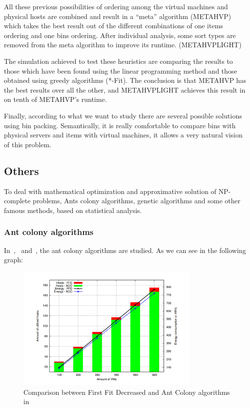 All these previous possibilities of ordering among the virtual machines and physical
hosts are combined and result in a “meta” algorithm (METAHVP) which takes the best result
out of the different combinations of one items ordering and one bins ordering. After
individual analysis, some sort types are removed from the meta algorithm to improve
its runtime. (METAHVPLIGHT)

The simulation achieved to test these heuristics are comparing the results to those
which have been found using the linear programming method and those obtained using
greedy algorithms (*-Fit). The conclusion is that METAHVP has the best results over
all the other, and METAHVPLIGHT achieves this result in on tenth of METAHVP's runtime.

Finally, according to what we want to study there are several possible solutions using
bin packing. Semantically, it is really comfortable to compare bins with physical servers
and items with virtual machines, it allows a very natural vision of this problem.

\subsection{Others}

To deal with mathematical optimization and approximative solution of NP-complete problems,
Ants colony algorithms, genetic algorithms and some other famous methods, based on statistical
analysis.

\subsubsection{Ant colony algorithms}

In~\cite{algoAntcolony1},~\cite{algoAntcolony2} and~\cite{algoAntcolony3}, the ant colony
algorithms are studied. As we can see in the following graph:

\begin{figure}[H]
\begin{center}
	\includegraphics[width=0.8\textwidth]{./Images/antcolonyperf.png}
	\caption{Comparison between First Fit Decreased and Ant Colony algorithms in~\cite{algoAntcolony2}}
\end{center}
\end{figure}

